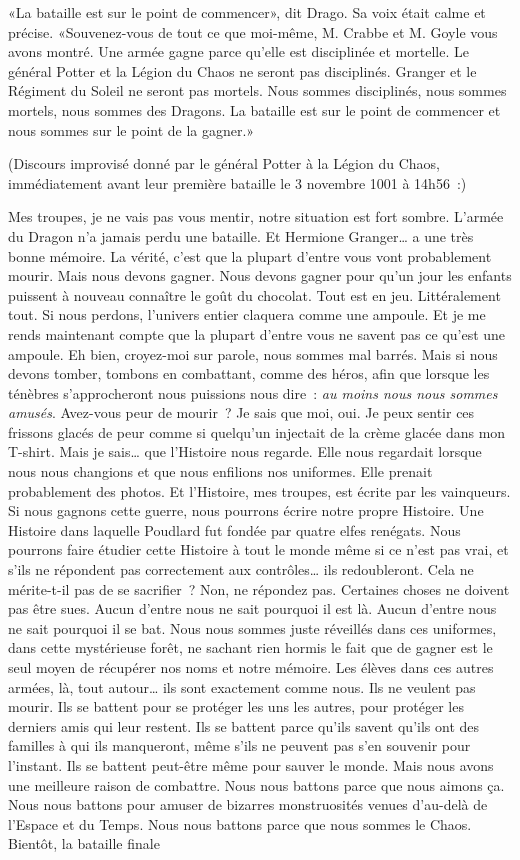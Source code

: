 «La bataille est sur le point de commencer», dit Drago. Sa voix était calme et précise. «Souvenez-vous de tout ce que moi-même, M. Crabbe et M. Goyle vous avons montré. Une armée gagne parce qu'elle est disciplinée et mortelle. Le général Potter et la Légion du Chaos ne seront pas disciplinés. Granger et le Régiment du Soleil ne seront pas mortels. Nous sommes disciplinés, nous sommes mortels, nous sommes des Dragons. La bataille est sur le point de commencer et nous sommes sur le point de la gagner.»

\later

(Discours improvisé donné par le général Potter à la Légion du Chaos, immédiatement avant leur première bataille le 3 novembre 1001 à 14h56~:)

Mes troupes, je ne vais pas vous mentir, notre situation est fort sombre. L'armée du Dragon n'a jamais perdu une bataille. Et Hermione Granger… a une très bonne mémoire. La vérité, c'est que la plupart d'entre vous vont probablement mourir. Mais nous devons gagner. Nous devons gagner pour qu'un jour les enfants puissent à nouveau connaître le goût du chocolat. Tout est en jeu. Littéralement tout. Si nous perdons, l'univers entier claquera comme une ampoule. Et je me rends maintenant compte que la plupart d'entre vous ne savent pas ce qu'est une ampoule. Eh bien, croyez-moi sur parole, nous sommes mal barrés. Mais si nous devons tomber, tombons en combattant, comme des héros, afin que lorsque les ténèbres s'approcheront nous puissions nous dire~: \emph{au moins nous nous sommes amusés}. Avez-vous peur de mourir~? Je sais que moi, oui. Je peux sentir ces frissons glacés de peur comme si quelqu'un injectait de la crème glacée dans mon T-shirt. Mais je sais… que l'Histoire nous regarde. Elle nous regardait lorsque nous nous changions et que nous enfilions nos uniformes. Elle prenait probablement des photos. Et l'Histoire, mes troupes, est écrite par les vainqueurs. Si nous gagnons cette guerre, nous pourrons écrire notre propre Histoire. Une Histoire dans laquelle Poudlard fut fondée par quatre elfes renégats. Nous pourrons faire étudier cette Histoire à tout le monde même si ce n'est pas vrai, et s'ils ne répondent pas correctement aux contrôles… ils redoubleront. Cela ne mérite-t-il pas de se sacrifier~? Non, ne répondez pas. Certaines choses ne doivent pas être sues. Aucun d'entre nous ne sait pourquoi il est là. Aucun d'entre nous ne sait pourquoi il se bat. Nous nous sommes juste réveillés dans ces uniformes, dans cette mystérieuse forêt, ne sachant rien hormis le fait que de gagner est le seul moyen de récupérer nos noms et notre mémoire. Les élèves dans ces autres armées, là, tout autour… ils sont exactement comme nous. Ils ne veulent pas mourir. Ils se battent pour se protéger les uns les autres, pour protéger les derniers amis qui leur restent. Ils se battent parce qu'ils savent qu'ils ont des familles à qui ils manqueront, même s'ils ne peuvent pas s'en souvenir pour l'instant. Ils se battent peut-être même pour sauver le monde. Mais nous avons une meilleure raison de combattre. Nous nous battons parce que nous aimons ça. Nous nous battons pour amuser de bizarres monstruosités venues d'au-delà de l'Espace et du Temps. Nous nous battons parce que nous sommes le Chaos. Bientôt, la bataille finale 